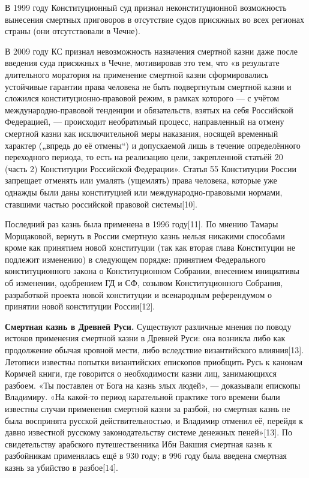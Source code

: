 В 1999 году Конституционный суд признал неконституционной возможность вынесения смертных приговоров в отсутствие судов присяжных во всех регионах страны (они отсутствовали в Чечне).

В 2009 году КС признал невозможность назначения смертной казни даже после введения суда присяжных в Чечне, мотивировав это тем, что «в результате длительного моратория на применение смертной казни сформировались устойчивые гарантии права человека не быть подвергнутым смертной казни и сложился конституционно-правовой режим, в рамках которого — с учётом международно-правовой тенденции и обязательств, взятых на себя Российской Федерацией, — происходит необратимый процесс, направленный на отмену смертной казни как исключительной меры наказания, носящей временный характер („впредь до её отмены“) и допускаемой лишь в течение определённого переходного периода, то есть на реализацию цели, закрепленной статьёй 20 (часть 2) Конституции Российской Федерации». Статья 55 Конституции России запрещает отменять или умалять (ущемлять) права человека, которые уже однажды были даны конституцией или международно-правовыми нормами, ставшими частью российской правовой системы[10].

Последний раз казнь была применена в 1996 году[11]. По мнению Тамары Морщаковой, вернуть в России смертную казнь нельзя никакими способами кроме как принятием новой конституции (так как вторая глава Конституции не подлежит изменению) в следующем порядке: принятием Федерального конституционного закона о Конституционном Собрании, внесением инициативы об изменении, одобрением ГД и СФ, созывом Конституционного Собрания, разработкой проекта новой конституции и всенародным референдумом о принятии новой конституции России[12].

\textbf{Смертная казнь в Древней Руси.} Существуют различные мнения по поводу истоков применения смертной казни в Древней Руси: она возникла либо как продолжение обычая кровной мести, либо вследствие византийского влияния[13]. Летописи известны попытки византийских епископов приобщить Русь к канонам Кормчей книги, где говорится о необходимости казни лиц, занимающихся разбоем. «Ты поставлен от Бога на казнь злых людей», — доказывали епископы Владимиру. «На какой-то период карательной практике того времени были известны случаи применения смертной казни за разбой, но смертная казнь не была воспринята русской действительностью, и Владимир отменил её, перейдя к давно известной русскому законодательству системе денежных пеней»[13]. По свидетельству арабского путешественника Ибн Вакшия смертная казнь к разбойникам применялась ещё в 930 году; в 996 году была введена смертная казнь за убийство в разбое[14].

